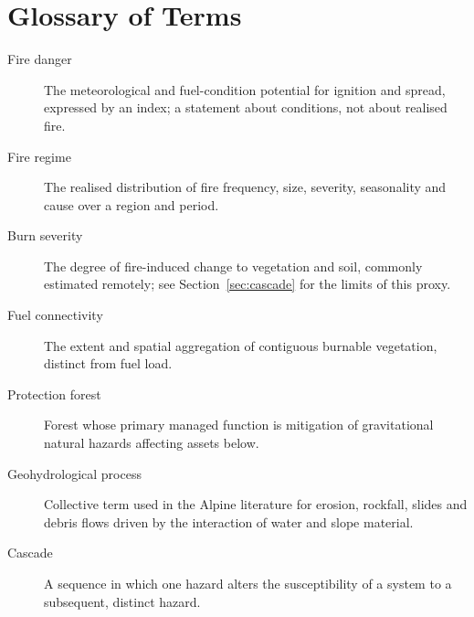 \documentclass[11pt,a4paper]{article}
\begin{document}
\section{Glossary of Terms}

\begin{description}
    \item[Fire danger] The meteorological and fuel-condition potential for ignition and spread, expressed by an index; a statement about conditions, not about realised fire.
    \item[Fire regime] The realised distribution of fire frequency, size, severity, seasonality and cause over a region and period.
    \item[Burn severity] The degree of fire-induced change to vegetation and soil, commonly estimated remotely; see Section~\ref{sec:cascade} for the limits of this proxy.
    \item[Fuel connectivity] The extent and spatial aggregation of contiguous burnable vegetation, distinct from fuel load.
    \item[Protection forest] Forest whose primary managed function is mitigation of gravitational natural hazards affecting assets below.
    \item[Geohydrological process] Collective term used in the Alpine literature for erosion, rockfall, slides and debris flows driven by the interaction of water and slope material.
    \item[Cascade] A sequence in which one hazard alters the susceptibility of a system to a subsequent, distinct hazard.
\end{description}




\end{document}
